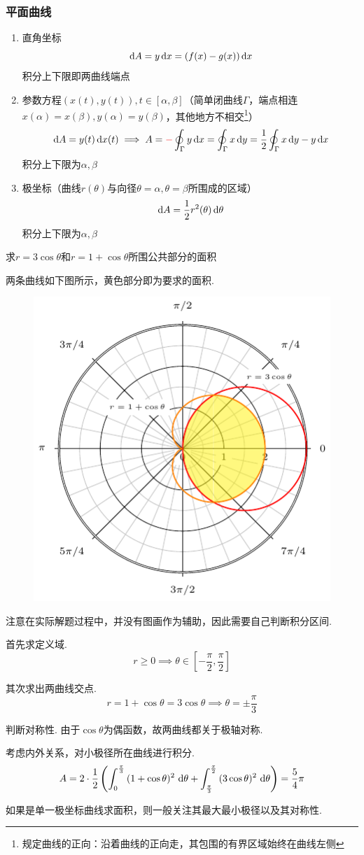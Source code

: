 \subsubsection{平面曲线}
\begin{enumerate}
	\item 直角坐标
	\[\,\mathrm{d} A=y\,\mathrm{d} x=(f(x)-g(x))\,\mathrm{d} x\]
	积分上下限即两曲线端点
	\item 参数方程$(x(t),y(t)),t\in[\alpha,\beta]$（简单闭曲线$\Gamma$，端点相连$x(\alpha)=x(\beta),y(\alpha)=y(\beta)$，其他地方不相交\footnote{规定曲线的正向：沿着曲线的正向走，其包围的有界区域始终在曲线左侧}）
	\[\,\mathrm{d} A=y(t)\,\mathrm{d} x(t)\implies A=\textcolor{red}{-}\oint_\Gamma y\,\mathrm{d} x=\oint_\Gamma x\,\mathrm{d} y=\frac{1}{2}\oint_\Gamma x\,\mathrm{d} y-y\,\mathrm{d} x\]
	积分上下限为$\alpha,\beta$
	\item 极坐标（曲线$r(\theta)$与向径$\theta=\alpha,\theta=\beta$所围成的区域）
	\[\,\mathrm{d} A=\dfrac{1}{2}r^2(\theta)\,\mathrm{d}\theta\]
	积分上下限为$\alpha,\beta$
\end{enumerate}
\begin{example}
求$r=3\cos\theta$和$r=1+\cos\theta$所围公共部分的面积
\end{example}
\begin{analysis}
两条曲线如下图所示，黄色部分即为要求的面积.
\begin{figure}[H]
\centering
\includegraphics[width=0.35\linewidth]{fig/polar_example.pdf}
\end{figure}
\par 注意在实际解题过程中，并没有图画作为辅助，因此需要自己判断积分区间.
\par 首先求定义域.
\[r\geq 0 \implies \theta\in[-\dfrac{\pi}{2},\dfrac{\pi}{2}]\]
\par 其次求出两曲线交点.
\[r=1+\cos\theta=3\cos\theta\implies\theta=\pm\dfrac{\pi}{3}\]
\par 判断对称性.
由于$\cos\theta$为偶函数，故两曲线都关于极轴对称.
\par 考虑内外关系，对小极径所在曲线进行积分.
\[A=2\cdot\dfrac{1}{2}\left(\displaystyle\int_{0}^{\frac{\pi}{3}}{(1+\cos\theta)^2}\,\,\mathrm{d} \theta+\displaystyle\int_{\frac{\pi}{3}}^{\frac{\pi}{2}}{(3\cos\theta)^2}\,\,\mathrm{d} \theta\right)=\dfrac{5}{4}\pi\]
\end{analysis}
\par 如果是单一极坐标曲线求面积，则一般关注其最大最小极径以及其对称性.

